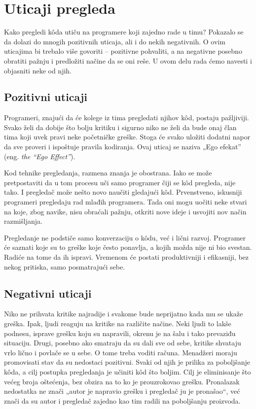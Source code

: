 \documentclass[a4paper]{article}
\begin{document}
\newpage
\section{Uticaji pregleda}
Kako pregledi kôda utiču na programere koji zajedno rade u timu? Pokazalo se da dolazi do mnogih pozitivnih uticaja, ali i do nekih negativnih. \cite{bkspcr} O ovim uticajima bi trebalo više govoriti -- pozitivne pohvaliti, a na negativne posebno obratiti pažnju i predložiti načine da se oni reše. U ovom delu rada ćemo navesti i objasniti neke od njih.

\subsection{Pozitivni uticaji}
Programeri, znajući da će kolege iz tima pregledati njihov kôd, postaju pažljiviji. Svako želi da dobije što bolju kritiku i sigurno niko ne želi da bude onaj član tima koji uvek pravi neke početničke greške. Stoga će svako uložiti dodatni napor da sve proveri i ispoštuje pravila kodiranja. Ovaj uticaj se naziva „Ego efekat” (eng. \emph{the “Ego Effect”}). \cite{bkspcr}

Kod tehnike pregledanja, razmena znanja je obostrana. Iako se može pretpostaviti da u tom procesu uči samo programer čiji se kôd pregleda, nije tako. I pregledač može nešto novo naučiti gledajući kôd. Prvenstveno, iskusniji programeri pregledaju rad mlađih programera. Tada oni mogu uočiti neke stvari na koje, zbog navike, nisu obraćali pažnju, otkriti nove ideje i usvojiti nov način razmišljanja.

Pregledanje ne podstiče samo konverzaciju o kôdu, već i lični razvoj. Programer će saznati koje su to greške koje često ponavlja, a kojih možda nije ni bio svestan. Radiće na tome da ih ispravi. Vremenom će postati produktivniji i efikasniji, bez nekog pritiska, samo posmatrajući sebe. \cite{bkspcr}

\subsection{Negativni uticaji}
Niko ne prihvata kritike najradije i svakome bude neprijatno kada mu se ukaže greška. Ipak, ljudi reaguju na kritike na različite načine. Neki ljudi to lakše podnesu, isprave grešku koju su napravili, okrenu je na šalu i tako prevaziđu situaciju. Drugi, posebno ako smatraju da su dali sve od sebe, kritike shvataju vrlo lično i povlače se u sebe. O tome treba voditi računa. Menadžeri moraju promovisati stav da su nedostaci pozitivni. Svaki od njih je prilika za poboljšanje kôda, a cilj postupka pregledanja je učiniti kôd što boljim. Cilj je eliminisanje što većeg broja oštećenja, bez obzira na to ko je prouzrokovao grešku. Pronalazak nedostatka ne znači „autor je napravio grešku i pregledač ju je pronašao“, već znači da su autor i pregledač zajedno kao tim radili na poboljšanju proizvoda. \cite{bkspcr} \cite{ibm}
\end{document}
